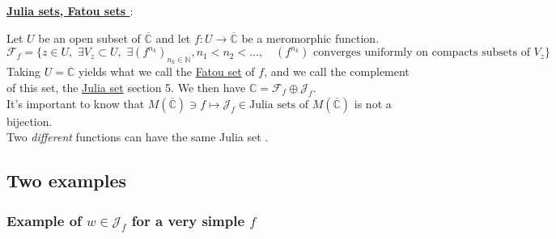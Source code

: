\documentclass{article}
\newcommand\N{\mathbb{N}}
\newcommand\C{\mathbb{C}}
\def\prop#1{\underline{\textbf{#1}}}
\begin{document}
\prop{Julia sets, Fatou sets \cite{Bea91}} : \\
\begin{changemargin}{1cm}{0cm}
Let $U$ be an open subset of $\overline{\C}$ and let $f : U \to \overline{\C}$ be a meromorphic function. \\
$$\mathcal{F}_f = \biggr\lbrace z \in U, \, \, \exists V_z \subset U, \, \, \exists (f^{n_k})_{n_k \in \N}, n_1 < n_2 < \dots, \quad (f^{n_k}) \text{ converges uniformly on compacts subsets of } V_z \biggr\rbrace$$
Taking $U = \C$ yields what we call the \underline{Fatou set} of $f$, and we call the complement of this set, the \underline{Julia set} \cite{Sut14} section 5. We then have $\C = \mathcal{F}_f \oplus \mathcal{J}_f$. \\
\vspace{2mm}
It's important to know that $M(\overline{\C}) \ni f \mapsto \mathcal{J}_f \in \text{Julia sets of }M(\overline{\C})$ is not a bijection. \\
Two \textit{different} functions can have the same Julia set \cite{Lev97}.
\end{changemargin}
\vspace{5mm}
\pagebreak

\subsection{Two examples}

\subsubsection{Example of $w \in \mathcal{J}_f$ for a very simple $f$}
\end{document}
